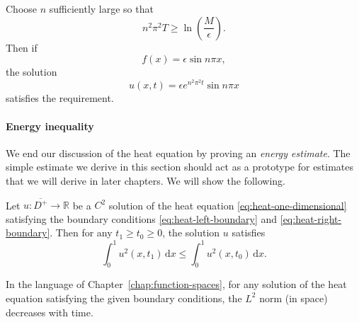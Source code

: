 \begin{Proof}
Choose $n$ sufficiently large so that
\begin{equation}\label{eq:backwards-frequency-choice}
n^2\pi^2T\geq\ln\left(\dfrac M\epsilon\right).
\end{equation}
Then if
\begin{equation}\label{eq:backwards-sine-initial-data}
f(x)=\epsilon\sin n\pi x,
\end{equation}
the solution
\begin{equation}\label{eq:backwards-growing-sine-solution}
u(x,t)=\epsilon e^{n^2\pi^2t}\sin n\pi x
\end{equation}
satisfies the requirement.
\end{Proof}

\paragraph*{Energy inequality}

We end our discussion of the heat equation by proving an \emph{energy estimate}. The simple estimate we derive in this section should act as a prototype for estimates that we will derive in later chapters. We will show the following.

\begin{Lemma}
\label{lem:heat-energy-decay}
Let $u:\overline{D^+}\to\mathbb{R}$ be a $C^2$ solution of the heat equation \eqref{eq:heat-one-dimensional} satisfying the boundary conditions \eqref{eq:heat-left-boundary} and \eqref{eq:heat-right-boundary}. Then for any $t_1\geq t_0\geq0$, the solution $u$ satisfies
\begin{equation}\label{eq:heat-energy-decay}
\int_0^1u^2(x,t_1)\,\mathrm{d}x\leq\int_0^1u^2(x,t_0)\,\mathrm{d}x.
\end{equation}

\end{Lemma}

In the language of Chapter~\ref{chap:function-spaces}, for any solution of the heat equation satisfying the given boundary conditions, the $L^2$ norm (in space) decreases with time.

